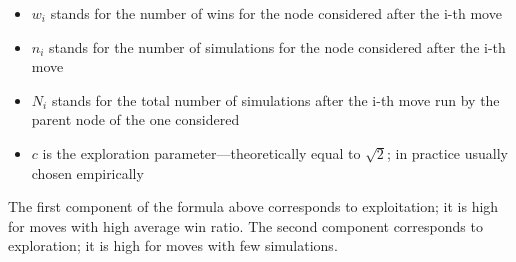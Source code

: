 \documentclass{article}
\begin{document}
\begin{itemize}
    \item \(w_{i}\) stands for the number of wins for the node considered after the i-th move
    \item \(n_{i}\) stands for the number of simulations for the node considered after the i-th move
    \item \(N_{i}\) stands for the total number of simulations after the i-th move run by the parent node of the one considered
    \item \(c\) is the exploration parameter—theoretically equal to \(\sqrt{2}\); in practice usually chosen empirically
\end{itemize}

\noindent The first component of the formula above corresponds to exploitation; it is high for moves with high average win ratio. The second component corresponds to exploration; it is high for moves with few simulations.

\printindex
\end{document}
